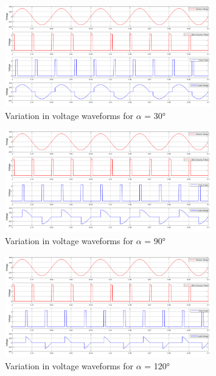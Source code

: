         	\begin{figure}[h!]
        		\centering
        		\includegraphics[width=0.8\textwidth]{photos/theory/pac_30.png}
        		\caption{Variation in voltage waveforms for $\alpha$ = \ang{30}}
        	\end{figure}
	        \begin{figure}[h!]
	        	\centering
	        	\includegraphics[width=0.8\textwidth]{photos/theory/pac_90.png}
	        	\caption{Variation in voltage waveforms for $\alpha$ = \ang{90}}
	        \end{figure}
		    \begin{figure}[h!]
		    	\centering
		    	\includegraphics[width=0.8\textwidth]{photos/theory/pac_120.png}
		    	\caption{Variation in voltage waveforms for $\alpha$ = \ang{120}}
		    \end{figure}
	

			        
